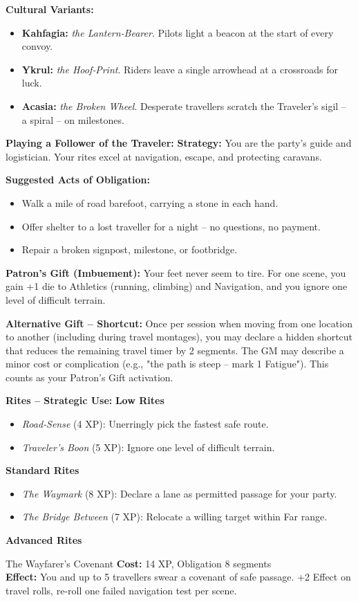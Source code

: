 \documentclass[10pt,a5paper]{book}
\begin{document}
\textbf{Cultural Variants:}
\begin{itemize}
    \item \textbf{Kahfagia:} \textit{the Lantern‑Bearer}. Pilots light a beacon at the start of every convoy.
    \item \textbf{Ykrul:} \textit{the Hoof‑Print}. Riders leave a single arrowhead at a crossroads for luck.
    \item \textbf{Acasia:} \textit{the Broken Wheel}. Desperate travellers scratch the Traveler's sigil -- a spiral -- on milestones.
\end{itemize}

\textbf{Playing a Follower of the Traveler:}
\textbf{Strategy:} You are the party's guide and logistician. Your rites excel at navigation, escape, and protecting caravans.

\textbf{Suggested Acts of Obligation:}
\begin{itemize}
    \item Walk a mile of road barefoot, carrying a stone in each hand.
    \item Offer shelter to a lost traveller for a night -- no questions, no payment.
    \item Repair a broken signpost, milestone, or footbridge.
\end{itemize}

\textbf{Patron's Gift (Imbuement):} Your feet never seem to tire. For one scene, you gain +1 die to Athletics (running, climbing) and Navigation, and you ignore one level of difficult terrain.

\textbf{Alternative Gift -- Shortcut:} Once per session when moving from one location to another (including during travel montages), you may declare a hidden shortcut that reduces the remaining travel timer by 2 segments. The GM may describe a minor cost or complication (e.g., "the path is steep -- mark 1 Fatigue"). This counts as your Patron's Gift activation.

\textbf{Rites -- Strategic Use:}
\textbf{Low Rites}
\begin{itemize}
    \item \textit{Road‑Sense} (4 XP): Unerringly pick the fastest safe route.
    \item \textit{Traveler's Boon} (5 XP): Ignore one level of difficult terrain.
\end{itemize}
\textbf{Standard Rites}
\begin{itemize}
    \item \textit{The Waymark} (8 XP): Declare a lane as permitted passage for your party.
    \item \textit{The Bridge Between} (7 XP): Relocate a willing target within Far range.
\end{itemize}
\textbf{Advanced Rites}
\begin{patronbox}{The Wayfarer's Covenant}
\textbf{Cost:} 14 XP, Obligation 8 segments \\
\textbf{Effect:} You and up to 5 travellers swear a covenant of safe passage. +2 Effect on travel rolls, re‑roll one failed navigation test per scene.
\end{patronbox}
\end{document}
